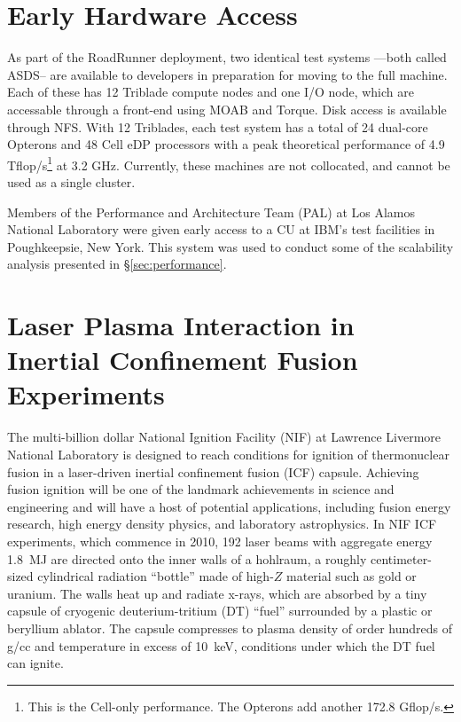 \documentclass[letter,10pt]{article}
\begin{document}
\section*{Early Hardware Access}

As part of the RoadRunner deployment, two identical test systems
---both called ASDS-- are available to developers in preparation
for moving to the full machine.  Each of these has 12 Triblade
compute nodes and one I/O node, which are accessable through a
front-end using MOAB and Torque.  Disk access is available
through NFS.  With 12 Triblades, each test system has a total of
24 dual-core Opterons and 48 Cell eDP processors with a peak
theoretical performance of 4.9 Tflop/s\footnote{This is the
Cell-only performance.  The Opterons add another 172.8 Gflop/s.}
at 3.2 GHz.  Currently, these machines are not collocated,
and cannot be used as a single cluster.

Members of the Performance and Architecture Team (PAL) at
Los Alamos National Laboratory were given early access to a
CU at IBM's test facilities in Poughkeepsie, New York.  This system
was used to conduct some of the scalability analysis presented
in \S \ref{sec:performance}.

\section*{Laser Plasma Interaction in Inertial Confinement Fusion Experiments}

The multi-billion dollar National Ignition Facility (NIF) at 
Lawrence Livermore National Laboratory
is designed to reach conditions for ignition of thermonuclear fusion in a 
laser-driven inertial confinement fusion (ICF) capsule.  Achieving fusion ignition 
will be one of the landmark achievements in science and engineering and will
have a host of potential applications, including fusion energy research, 
high energy density physics, and laboratory astrophysics.  
In NIF ICF experiments, which commence in 2010, 192 laser beams with aggregate 
energy 1.8~MJ are directed onto the inner walls of a hohlraum, 
a roughly centimeter-sized cylindrical radiation ``bottle'' made of high-$Z$ material 
such as gold or uranium.  The walls heat up and radiate x-rays, which are absorbed 
by a tiny capsule
of cryogenic deuterium-tritium (DT) ``fuel'' surrounded by a plastic or beryllium 
ablator.  The capsule compresses to plasma density of order hundreds of g/cc and 
temperature in excess of 10~keV, conditions under which the DT fuel can ignite. 
\end{document}
